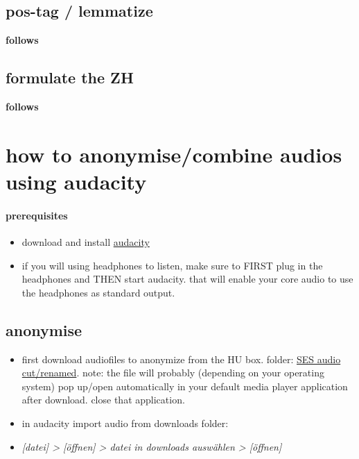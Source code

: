 \documentclass[
  12pt,
]{article}
\providecommand{\tightlist}{%
  \setlength{\itemsep}{0pt}\setlength{\parskip}{0pt}}
\begin{document}
\hypertarget{pos-tag-lemmatize}{%
\subsection{pos-tag / lemmatize}\label{pos-tag-lemmatize}}

\textbf{follows}

\hypertarget{formulate-the-zh}{%
\subsection{formulate the ZH}\label{formulate-the-zh}}

\textbf{follows}

\hypertarget{how-to-anonymisecombine-audios-using-audacity}{%
\section{how to anonymise/combine audios using
audacity}\label{how-to-anonymisecombine-audios-using-audacity}}

\hypertarget{prerequisites}{%
\paragraph{prerequisites}\label{prerequisites}}

\begin{itemize}
\tightlist
\item
  download and install \href{https://audacityteam.org}{audacity}
\item
  if you will using headphones to listen, make sure to FIRST plug in the
  headphones and THEN start audacity. that will enable your core audio
  to use the headphones as standard output.
\end{itemize}

\hypertarget{anonymise}{%
\subsection{anonymise}\label{anonymise}}

\begin{itemize}
\tightlist
\item
  first download audiofiles to anonymize from the HU box. folder:
  \href{https://box.hu-berlin.de/smart-link/04099902-f842-4a14-985c-5e9ec29d917a/}{SES
  audio cut/renamed}. note: the file will probably (depending on your
  operating system) pop up/open automatically in your default media
  player application after download. close that application.
\item
  in audacity import audio from downloads folder:
\item
  \emph{{[}datei{]} \textgreater{} {[}öffnen{]} \textgreater{} datei in
  downloads auswählen \textgreater{} {[}öffnen{]}}
\end{itemize}
\end{document}
